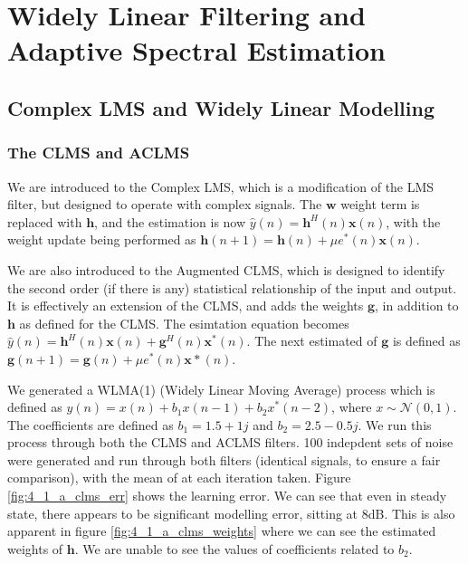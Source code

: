 \documentclass[./main.tex]{subfiles}
\begin{document}
\section{Widely Linear Filtering and Adaptive Spectral Estimation}

\subsection{Complex LMS and Widely Linear Modelling}

\subsubsection{The CLMS and ACLMS}
We are introduced to the Complex LMS, which is a modification of the LMS filter, but designed to operate with complex signals. The $ \mathbf{w}$ weight term is replaced with $ \mathbf{h}$, and the estimation is now $ \hat{y}(n) = \mathbf{h}^H(n) \mathbf{x}(n) $, with the weight update being performed as $ \mathbf{h}(n+1) = \mathbf{h}(n) + \mu e^{\ast}(n)\mathbf{x}(n) $.

We are also introduced to the Augmented CLMS, which is designed to identify the second order (if there is any) statistical relationship of the input and output. It is effectively an extension of the CLMS, and adds the weights $ \mathbf{g}$, in addition to $ \mathbf{h}$ as defined for the CLMS. The esimtation equation becomes  $ \hat{y}(n) = \mathbf{h}^H(n) \mathbf{x}(n) + \mathbf{g}^H(n) \mathbf{x}^\ast(n) $. The next estimated of $ \mathbf{g}$ is defined as $ \mathbf{g}(n+1) = \mathbf{g}(n) + \mu e^{\ast}(n)\mathbf{x}\ast(n) $.

We generated a WLMA(1) (Widely Linear Moving Average) process which is defined as $ y(n) = x(n) + b_1 x(n-1) + b_2 x^{\ast}(n-2) $, where $ x \sim \mathcal{N} (0,1) $. The coefficients are defined as $ b_1 = 1.5 + 1j $ and $ b_2 = 2.5 - 0.5j$. We run this process through both the CLMS and ACLMS filters. 100 indepdent sets of noise were generated and run through both filters (identical signals, to ensure a fair comparison), with the mean of at each iteration taken. Figure \ref{fig:4_1_a_clms_err} shows the learning error. We can see that even in steady state, there appears to be significant modelling error, sitting at 8dB. This is also apparent in figure \ref{fig:4_1_a_clms_weights} where we can see the estimated weights of $\mathbf{h}$. We are unable to see the values of coefficients related to $ b_2 $.
\end{document}
